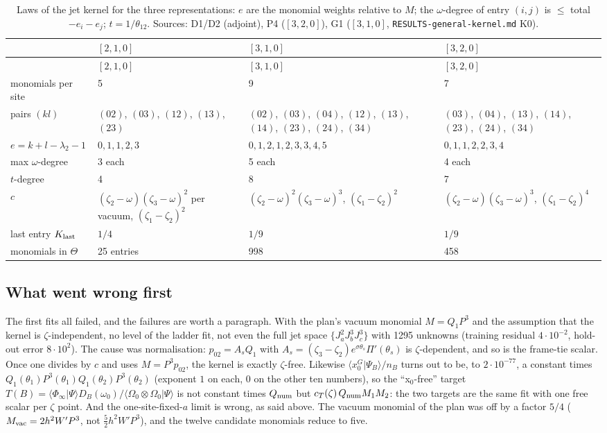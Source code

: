 \documentclass[11pt]{article}
\begin{document}
{\small
\begin{longtable}{p{2.6cm}p{3.4cm}p{4.4cm}p{4.2cm}}
\caption{Laws of the jet kernel for the three representations: $e$ are the monomial weights relative to $M$; the $\omega$-degree of entry $(i,j)$ is $\le$ total $-e_i-e_j$; $t=1/\theta_{12}$. Sources: D1/D2 (adjoint), P4 ($[3,2,0]$), G1 ($[3,1,0]$, \texttt{RESULTS-\allowbreak{}general-\allowbreak{}kernel.\allowbreak{}md} K0).}\label{tab:laws}\\
\toprule
 & $[2,1,0]$ & $[3,1,0]$ & $[3,2,0]$ \\
\midrule
\endfirsthead
\toprule
 & $[2,1,0]$ & $[3,1,0]$ & $[3,2,0]$ \\
\midrule
\endhead
\bottomrule
\endlastfoot
monomials per site & 5 & 9 & 7 \\
pairs $(kl)$ & $(02)$, $(03)$, $(12)$, $(13)$, $(23)$ & $(02)$, $(03)$, $(04)$, $(12)$, $(13)$, $(14)$, $(23)$, $(24)$, $(34)$ & $(03)$, $(04)$, $(13)$, $(14)$, $(23)$, $(24)$, $(34)$ \\
$e=k+l-\lambda_2-1$ & $0,1,1,2,3$ & $0,1,2,1,2,3,3,4,5$ & $0,1,1,2,2,3,4$ \\
max $\omega$-degree & 3 each & 5 each & 4 each \\
$t$-degree & 4 & 8 & 7 \\
$c$ & $(\zeta_2-\omega)(\zeta_3-\omega)^2$ per vacuum, $(\zeta_1-\zeta_2)^2$ & $(\zeta_2-\omega)^2(\zeta_3-\omega)^3$, $(\zeta_1-\zeta_2)^2$ & $(\zeta_2-\omega)(\zeta_3-\omega)^3$, $(\zeta_1-\zeta_2)^4$ \\
last entry $K_{\rm last}$ & $1/4$ & $1/9$ & $1/9$ \\
monomials in $\Theta$ & 25 entries & 998 & 458 \\
\end{longtable}}


\subsection{What went wrong first}\label{sec:wrong}

The first fits all failed, and the failures are worth a paragraph.
With the plan's vacuum monomial $M=Q_1P^3$ and the assumption that the kernel is $\zeta$-independent, no level of the ladder fit, not even the full jet space $\{J^2_aJ^3_bJ^3_c\}$ with 1295 unknowns (training residual $4\cdot10^{-2}$, hold-out error $8\cdot10^2$).
The cause was normalisation: $p_{02}=A_sQ_1$ with $A_s=(\zeta_3-\zeta_2)e^{\sigma\theta_s}\Pi'(\theta_s)$ is $\zeta$-dependent, and so is the frame-tie scalar.
Once one divides by $c$ and uses $M=P^3p_{02}$, the kernel is exactly $\zeta$-free.
Likewise $\langle x_0^G|\Psi_B\rangle/n_B$ turns out to be, to $2\cdot10^{-77}$, a constant times $Q_1(\theta_1)P^3(\theta_1)Q_1(\theta_2)P^3(\theta_2)$ (exponent $1$ on each, $0$ on the other ten numbers), so the ``x$_0$-free'' target $T(B)=\langle\Phi_\infty|\Psi\rangle D_B(\omega_0)/\langle\Omega_0\otimes\Omega_0|\Psi\rangle$ is not constant times $Q_{\rm num}$ but $c_T(\zeta)\,Q_{\rm num}M_1M_2$: the two targets are the same fit with one free scalar per $\zeta$ point.
And the one-site-fixed-$a$ limit is wrong, as said above.
The vacuum monomial of the plan was off by a factor $5/4$ ($M_{\rm vac}=2h^2W'P^3$, not $\tfrac52h^2W'P^3$), and the twelve candidate monomials reduce to five.
\end{document}
